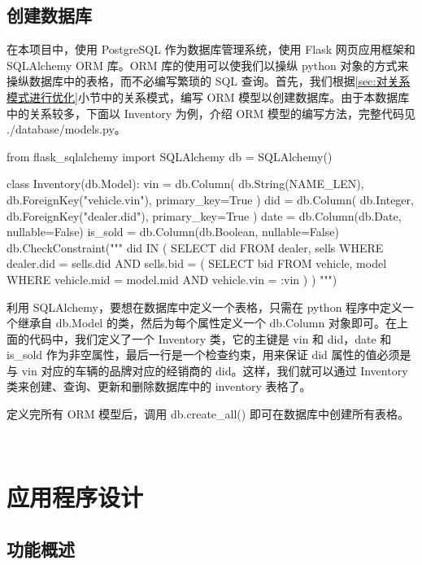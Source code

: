 \documentclass[hyperref,a4paper,UTF8]{ctexart}
\begin{document}
\subsection{创建数据库}

在本项目中，使用 PostgreSQL 作为数据库管理系统，使用 Flask 网页应用框架和 SQLAlchemy ORM 库。ORM 库的使用可以使我们以操纵 python 对象的方式来操纵数据库中的表格，而不必编写繁琐的 SQL 查询。首先，我们根据\ref{sec:对关系模式进行优化}小节中的关系模式，编写 ORM 模型以创建数据库。由于本数据库中的关系较多，下面以 Inventory 为例，介绍 ORM 模型的编写方法，完整代码见 ./database/models.py。

\begin{python}
from flask_sqlalchemy import SQLAlchemy
db = SQLAlchemy()

class Inventory(db.Model):
    vin = db.Column(
        db.String(NAME_LEN),
        db.ForeignKey("vehicle.vin"),
        primary_key=True
    )
    did = db.Column(
        db.Integer,
        db.ForeignKey("dealer.did"),
        primary_key=True
    )
    date = db.Column(db.Date, nullable=False)
    is_sold = db.Column(db.Boolean, nullable=False)
    db.CheckConstraint("""
        did IN (
            SELECT did
            FROM dealer, sells
            WHERE dealer.did = sells.did AND sells.bid = (
                SELECT bid
                FROM vehicle, model
                WHERE vehicle.mid = model.mid AND vehicle.vin = :vin
            )
        )
    """)
\end{python}

利用 SQLAlchemy，要想在数据库中定义一个表格，只需在 python 程序中定义一个继承自 db.Model 的类，然后为每个属性定义一个 db.Column 对象即可。在上面的代码中，我们定义了一个 Inventory 类，它的主键是 vin 和 did，date 和 is\_sold 作为非空属性，最后一行是一个检查约束，用来保证 did 属性的值必须是与 vin 对应的车辆的品牌对应的经销商的 did。这样，我们就可以通过 Inventory 类来创建、查询、更新和删除数据库中的 inventory 表格了。

定义完所有 ORM 模型后，调用 db.create\_all() 即可在数据库中创建所有表格。

\

\section{应用程序设计\label{sec:应用程序设计}}

\subsection{功能概述}
\end{document}
